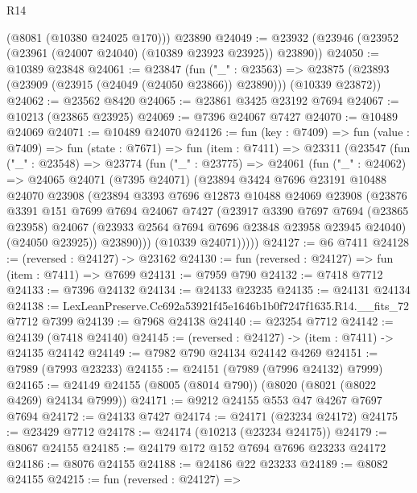 \begin{lexlean}{R14}
\begin{coremodule}
      (@8081 (@10380 @24025 @170)))
    @23890
@24049 := @23932 (@23946 (@23952 (@23961 (@24007 @24040) (@10389 @23923 @23925)) @23890))
@24050 := @10389 @23848
@24061 := @23847
    (fun ("_" : @23563) =>
    @23875 (@23893 (@23909 (@23915 (@24049 (@24050 @23866)) @23890))) (@10339 @23872))
@24062 := @23562 @8420
@24065 := @23861 @3425 @23192 @7694
@24067 := @10213 (@23865 @23925)
@24069 := @7396 @24067 @7427
@24070 := @10489 @24069
@24071 := @10489 @24070
@24126 := fun (key : @7409) =>
  fun (value : @7409) =>
  fun (state : @7671) =>
  fun (item : @7411) =>
  @23311
    (@23547
      (fun ("_" : @23548) =>
      @23774
        (fun ("_" : @23775) =>
        @24061
          (fun ("_" : @24062) =>
          @24065
            @24071
            (@7395 @24071)
            (@23894
              @3424
              @7696
              @23191
              @10488
              @24070
              @23908
              (@23894
                @3393
                @7696
                @12873
                @10488
                @24069
                @23908
                (@23876
                  @3391
                  @151
                  @7699
                  @7694
                  @24067
                  @7427
                  (@23917
                    @3390
                    @7697
                    @7694
                    (@23865 @23958)
                    @24067
                    (@23933 @2564 @7694 @7696 @23848 @23958 @23945 @24040)
                    (@24050 @23925))
                  @23890)))
            (@10339 @24071)))))
@24127 := @6 @7411
@24128 := (reversed : @24127) -> @23162
@24130 := fun (reversed : @24127) => fun (item : @7411) => @7699
@24131 := @7959 @790
@24132 := @7418 @7712
@24133 := @7396 @24132
@24134 := @24133 @23235
@24135 := @24131 @24134
@24138 := LexLeanPreserve.Cc692a53921f45e1646b1b0f7247f1635.R14.__fits_72 @7712 @7399
@24139 := @7968 @24138
@24140 := @23254 @7712
@24142 := @24139 (@7418 @24140)
@24145 := (reversed : @24127) -> (item : @7411) -> @24135 @24142
@24149 := @7982 @790 @24134 @24142 @4269
@24151 := @7989 (@7993 @23233)
@24155 := @24151 (@7989 (@7996 @24132) @7999)
@24165 := @24149 @24155 (@8005 (@8014 @790)) (@8020 (@8021 (@8022 @4269) @24134 @7999))
@24171 := @9212 @24155 @553 @47 @4267 @7697 @7694
@24172 := @24133 @7427
@24174 := @24171 (@23234 @24172)
@24175 := @23429 @7712
@24178 := @24174 (@10213 (@23234 @24175))
@24179 := @8067 @24155
@24185 := @24179 @172 @152 @7694 @7696 @23233 @24172
@24186 := @8076 @24155
@24188 := @24186 @22 @23233
@24189 := @8082 @24155
@24215 := fun (reversed : @24127) =>

\end{coremodule}
\end{lexlean}
